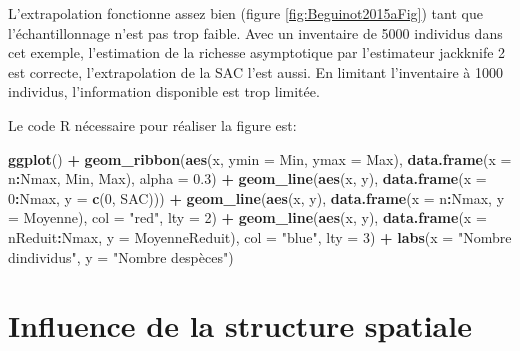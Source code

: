 \documentclass[
  11pt,
  french,
  a4paper,
  extrafontsizes,onecolumn,openright
  ]{memoir}
\newenvironment{Shaded}{\begin{snugshade}}{\end{snugshade}}
\newcommand{\AttributeTok}[1]{\textcolor[rgb]{0.13,0.29,0.53}{#1}}
\newcommand{\DecValTok}[1]{\textcolor[rgb]{0.00,0.00,0.81}{#1}}
\newcommand{\FloatTok}[1]{\textcolor[rgb]{0.00,0.00,0.81}{#1}}
\newcommand{\FunctionTok}[1]{\textcolor[rgb]{0.13,0.29,0.53}{\textbf{#1}}}
\newcommand{\NormalTok}[1]{#1}
\newcommand{\SpecialCharTok}[1]{\textcolor[rgb]{0.81,0.36,0.00}{\textbf{#1}}}
\newcommand{\StringTok}[1]{\textcolor[rgb]{0.31,0.60,0.02}{#1}}
\begin{document}
\normalsize

L'extrapolation fonctionne assez bien (figure \ref{fig:Beguinot2015aFig}) tant que l'échantillonnage n'est pas trop faible.
Avec un inventaire de 5000 individus dans cet exemple, l'estimation de la richesse asymptotique par l'estimateur jackknife 2 est correcte, l'extrapolation de la SAC l'est aussi.
En limitant l'inventaire à 1000 individus, l'information disponible est trop limitée.

Le code R nécessaire pour réaliser la figure est:

\scriptsize

\begin{Shaded}
\begin{Highlighting}[]
\FunctionTok{ggplot}\NormalTok{() }\SpecialCharTok{+}
  \FunctionTok{geom\_ribbon}\NormalTok{(}\FunctionTok{aes}\NormalTok{(x, }\AttributeTok{ymin =}\NormalTok{ Min, }\AttributeTok{ymax =}\NormalTok{ Max), }
              \FunctionTok{data.frame}\NormalTok{(}\AttributeTok{x =}\NormalTok{ n}\SpecialCharTok{:}\NormalTok{Nmax, Min, Max), }\AttributeTok{alpha =} \FloatTok{0.3}\NormalTok{) }\SpecialCharTok{+}
  \FunctionTok{geom\_line}\NormalTok{(}\FunctionTok{aes}\NormalTok{(x, y), }\FunctionTok{data.frame}\NormalTok{(}\AttributeTok{x =} \DecValTok{0}\SpecialCharTok{:}\NormalTok{Nmax, }\AttributeTok{y =} \FunctionTok{c}\NormalTok{(}\DecValTok{0}\NormalTok{, SAC))) }\SpecialCharTok{+}
  \FunctionTok{geom\_line}\NormalTok{(}\FunctionTok{aes}\NormalTok{(x, y), }\FunctionTok{data.frame}\NormalTok{(}\AttributeTok{x =}\NormalTok{ n}\SpecialCharTok{:}\NormalTok{Nmax, }\AttributeTok{y =}\NormalTok{ Moyenne), }
            \AttributeTok{col =} \StringTok{"red"}\NormalTok{, }\AttributeTok{lty =} \DecValTok{2}\NormalTok{) }\SpecialCharTok{+}
  \FunctionTok{geom\_line}\NormalTok{(}\FunctionTok{aes}\NormalTok{(x, y), }\FunctionTok{data.frame}\NormalTok{(}\AttributeTok{x =}\NormalTok{ nReduit}\SpecialCharTok{:}\NormalTok{Nmax, }\AttributeTok{y =}\NormalTok{ MoyenneReduit), }
            \AttributeTok{col =} \StringTok{"blue"}\NormalTok{, }\AttributeTok{lty =} \DecValTok{3}\NormalTok{) }\SpecialCharTok{+}
  \FunctionTok{labs}\NormalTok{(}\AttributeTok{x =} \StringTok{"Nombre d\textquotesingle{}individus"}\NormalTok{, }\AttributeTok{y =} \StringTok{"Nombre d\textquotesingle{}espèces"}\NormalTok{)}
\end{Highlighting}
\end{Shaded}

\normalsize

\section{Influence de la structure spatiale}\label{influence-de-la-structure-spatiale}
\end{document}

